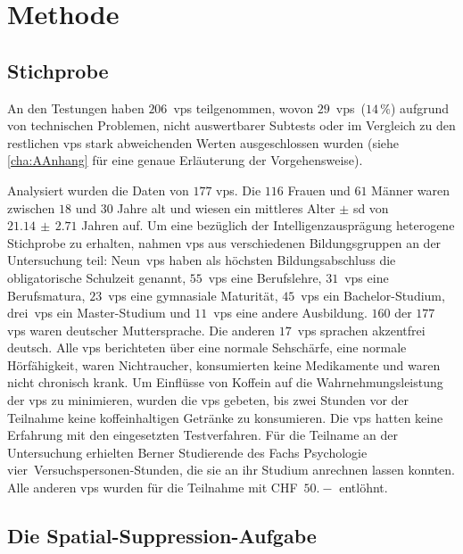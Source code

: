\documentclass[11pt, twoside, a4paper]{book}		%
\begin{document}
\chapter{Methode \label{cha:Methode}}

\section{Stichprobe \label{sec:Stichprobe}}

An den Testungen haben $206$~\glspl{vp} teilgenommen, wovon $29$~\glspl{vp}~($14\,\%$) aufgrund von technischen Problemen, nicht auswertbarer Subtests oder im Vergleich zu den restlichen \glspl{vp} stark abweichenden Werten ausgeschlossen wurden (siehe \autoref{cha:AAnhang} für eine genaue Erläuterung der Vorgehensweise).

Analysiert wurden die Daten von $177$ \glspl{vp}. Die $116$ Frauen und $61$ Männer waren zwischen $18$ und $30$ Jahre alt und wiesen ein mittleres Alter $\pm$ \gls{sd} von $21.14\,\pm\,2.71$ Jahren auf. 
Um eine bezüglich der Intelligenzausprägung heterogene Stichprobe zu erhalten, nahmen \glspl{vp} aus verschiedenen Bildungsgruppen an der Untersuchung teil:
Neun~\glspl{vp} haben als höchsten Bildungsabschluss die obligatorische Schulzeit genannt,
$55$~\glspl{vp} eine Berufslehre,
$31$~\glspl{vp} eine Berufsmatura,
$23$~\glspl{vp} eine gymnasiale Maturität,
$45$~\glspl{vp} ein Bachelor-Studium,
drei~\glspl{vp} ein Master-Studium und 
$11$~\glspl{vp} eine andere Ausbildung.
$160$ der $177$ \glspl{vp} waren deutscher Muttersprache. Die anderen $17$~\glspl{vp} sprachen akzentfrei deutsch. Alle \glspl{vp} berichteten über eine normale Sehschärfe, eine normale Hörfähigkeit, waren Nichtraucher, konsumierten keine Medikamente und waren nicht chronisch krank. Um Einflüsse von Koffein auf die Wahrnehmungsleistung \citep[][]{Stough1995} der \glspl{vp} zu minimieren, wurden die \glspl{vp} gebeten, bis zwei Stunden vor der Teilnahme keine koffeinhaltigen Getränke zu konsumieren. Die \glspl{vp} hatten keine Erfahrung mit den eingesetzten Testverfahren. 
Für die Teilname an der Untersuchung erhielten Berner Studierende des Fachs Psychologie vier~Ver\-suchs\-per\-sonen-Stun\-den, die sie an ihr Studium anrechnen lassen konnten. Alle anderen \glspl{vp} wurden für die Teilnahme mit CHF~$50.-$ entlöhnt.




\section{Die Spatial-Suppression-Aufgabe \label{sec:}}
\end{document}
